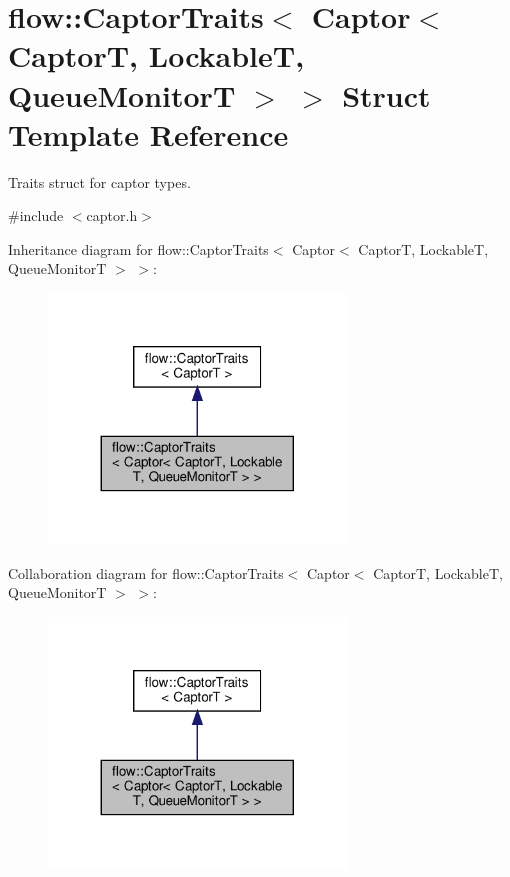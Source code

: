 \hypertarget{structflow_1_1_captor_traits_3_01_captor_3_01_captor_t_00_01_lockable_t_00_01_queue_monitor_t_01_4_01_4}{}\section{flow\+:\+:Captor\+Traits$<$ Captor$<$ CaptorT, LockableT, Queue\+MonitorT $>$ $>$ Struct Template Reference}
\label{structflow_1_1_captor_traits_3_01_captor_3_01_captor_t_00_01_lockable_t_00_01_queue_monitor_t_01_4_01_4}


Traits struct for captor types.  




{\ttfamily \#include $<$captor.\+h$>$}



Inheritance diagram for flow\+:\+:Captor\+Traits$<$ Captor$<$ CaptorT, LockableT, Queue\+MonitorT $>$ $>$\+:
\nopagebreak
\begin{figure}[H]
\begin{center}
\leavevmode
\includegraphics[width=224pt]{structflow_1_1_captor_traits_3_01_captor_3_01_captor_t_00_01_lockable_t_00_01_queue_monitor_t_01_4_01_4__inherit__graph}
\end{center}
\end{figure}


Collaboration diagram for flow\+:\+:Captor\+Traits$<$ Captor$<$ CaptorT, LockableT, Queue\+MonitorT $>$ $>$\+:
\nopagebreak
\begin{figure}[H]
\begin{center}
\leavevmode
\includegraphics[width=224pt]{structflow_1_1_captor_traits_3_01_captor_3_01_captor_t_00_01_lockable_t_00_01_queue_monitor_t_01_4_01_4__coll__graph}
\end{center}
\end{figure}


